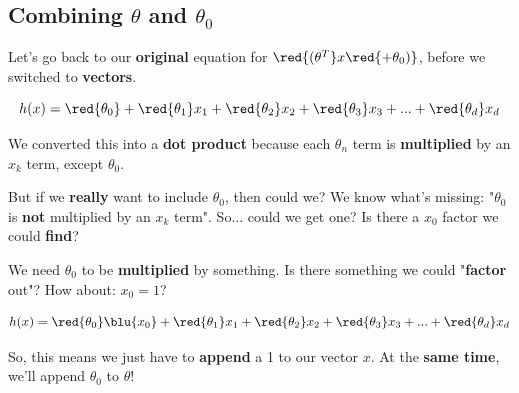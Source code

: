     \subsection{Combining $\theta$ and $\theta_0$}
        
         Let's go back to our \textbf{original} equation for $\red{ (\theta^T} x \red{ + \theta_0) } $, before we switched to \textbf{vectors}.
        
        \begin{equation}
            h(x) = \red{\theta_0} + \red{\theta_1}x_1 + \red{\theta_2}x_2 + \red{\theta_3}x_3 + ... + \red{\theta_d}x_d
        \end{equation}
        
        We converted this into a \textbf{dot product} because each $\theta_n$ term is \textbf{multiplied} by an $x_k$ term, except $\theta_0$.
        
        But if we \textbf{really} want to include $\theta_0$, then could we? We know what's missing: "$\theta_0$ is \textbf{not} multiplied by an $x_k$ term". So... could we get one? Is there a $x_0$ factor we could \textbf{find}?
        
        We need $\theta_0$ to be \textbf{multiplied} by something. Is there something we could "\textbf{factor} out"? How about: $x_0=1$?
        
        \begin{equation}
            h(x) = \red{\theta_0}\blu{x_0} + \red{\theta_1}x_1 + \red{\theta_2}x_2 + \red{\theta_3}x_3 + ... + \red{\theta_d}x_d
        \end{equation}
        
        So, this means we just have to \textbf{append} a 1 to our vector $x$. At the \textbf{same time}, we'll append $\theta_0$ to $\theta$!
        
